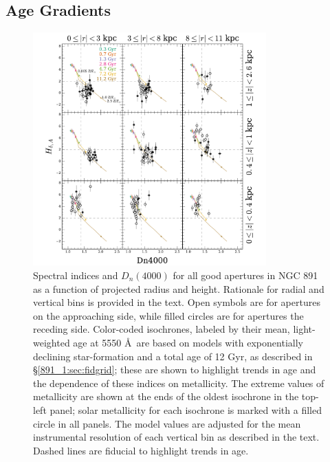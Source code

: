 \subsection{Age Gradients}
\label{891_1:sec:age_grad}
\begin{figure}
  \centering
  \includegraphics[width=0.8\textwidth]{891_1/figs/Dn4000_multires.pdf}
  \caption[$D_n(4000)$ vs \Hda in radius and height
  bins]{\label{891_1:fig:D4000_cuts}\fixspacing Spectral indices \Hda and
    $D_n(4000)$ for all good apertures in NGC 891 as a function of
    projected radius and height. Rationale for radial and vertical
    bins is provided in the text. Open symbols are for apertures on
    the approaching side, while filled circles are for apertures the
    receding side. Color-coded isochrones, labeled by their mean,
    light-weighted age at 5550 \AA\ are based on models with
    exponentially declining star-formation and a total age of 12 Gyr,
    as described in \S\ref{891_1:sec:fidgrid}; these are shown to
    highlight trends in age and the dependence of these indices on
    metallicity. The extreme values of metallicity are shown at the
    ends of the oldest isochrone in the top-left panel; solar
    metallicity for each isochrone is marked with a filled circle in
    all panels. The model values are adjusted for the mean
    instrumental resolution of each vertical bin as described in the
    text. Dashed lines are fiducial to highlight trends in age.}
\end{figure}

